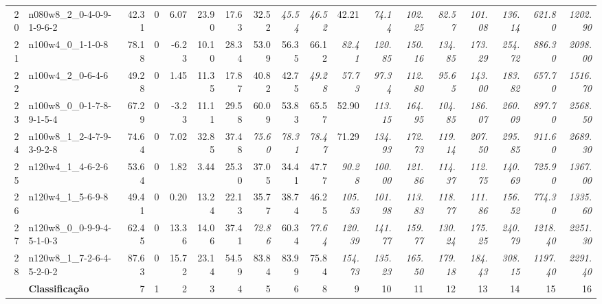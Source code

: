 \documentclass[cic,tc, twoside]{iiufrgs}
\begin{document}
\begin{landscape}
\begin{table}[ht!]
{\begin{tabular}{rlrrrrrrrrrrrrrrrr}
   20 & n080w8\_2\_0-4-0-9-1-9-6-2 & 42.31 &   0 & 6.07 & 23.90 & 17.63 & 32.52 & \it 45.54 & \it 46.52 & 42.21 & \it 74.14 & \it 102.25 & \it 82.57 & \it 101.08 & \it 136.14 & \it 621.80 & \it 1202.90 \\
   21 & n100w4\_0\_1-1-0-8 & 78.18 &   0 & -6.23 & 10.10 & 28.34 & 53.09 & 56.35 & 66.12 & \it 82.41 & \it 120.85 & \it 150.16 & \it 134.85 & \it 173.29 & \it 254.72 & \it 886.30 & \it 2098.00 \\
   22 & n100w4\_2\_0-6-4-6 & 49.28 &   0 & 1.45 & 11.35 & 17.87 & 40.82 & 42.75 & \it 49.28 & \it 57.73 & \it 97.34 & \it 112.80 & \it 95.65 & \it 143.00 & \it 183.82 & \it 657.70 & \it 1516.70 \\
   23 & n100w8\_0\_0-1-7-8-9-1-5-4 & 67.29 &   0 & -3.23 & 11.11 & 29.58 & 60.09 & 53.83 & 65.57 & 52.90 & \it 113.15 & \it 164.95 & \it 104.85 & \it 186.07 & \it 260.09 & \it 897.70 & \it 2568.50 \\
   24 & n100w8\_1\_2-4-7-9-3-9-2-8 & 74.64 &   0 & 7.02 & 32.85 & 37.48 & \it 75.60 & \it 78.31 & \it 78.47 & 71.29 & \it 134.93 & \it 172.73 & \it 119.14 & \it 207.50 & \it 295.85 & \it 911.60 & \it 2689.30 \\
   25 & n120w4\_1\_4-6-2-6 & 53.64 &   0 & 1.82 & 3.44 & 25.30 & 37.05 & 34.41 & 47.77 & \it 90.28 & \it 100.00 & \it 121.86 & \it 114.37 & \it 112.75 & \it 140.69 & \it 725.90 & \it 1367.00 \\
   26 & n120w4\_1\_5-6-9-8 & 49.41 &   0 & 0.20 & 13.24 & 22.13 & 35.77 & 38.74 & 46.25 & \it 105.53 & \it 101.98 & \it 113.83 & \it 118.77 & \it 111.86 & \it 156.52 & \it 774.30 & \it 1335.60 \\
   27 & n120w8\_0\_0-9-9-4-5-1-0-3 & 62.45 &   0 & 13.36 & 14.06 & 37.41 & \it 72.86 & 60.34 & \it 77.64 & \it 120.39 & \it 141.77 & \it 159.77 & \it 130.24 & \it 175.25 & \it 240.79 & \it 1218.40 & \it 2251.30 \\
   28 & n120w8\_1\_7-2-6-4-5-2-0-2 & 87.63 &   0 & 15.72 & 23.14 & 54.59 & 83.84 & 83.99 & 75.84 & \it 154.73 & \it 135.23 & \it 165.50 & \it 179.18 & \it 184.43 & \it 308.15 & \it 1197.40 & \it 2291.40 \\
\midrule  
& \textbf{Classificação} & 7 & 1 & 2 & 3 & 4 & 5 & 6 & 8 & 9 & 10 & 11 & 12 & 13 & 14 & 15 & 16  
\\ 
\bottomrule

\end{tabular}
}
\end{table}
\end{landscape}
\end{document}

